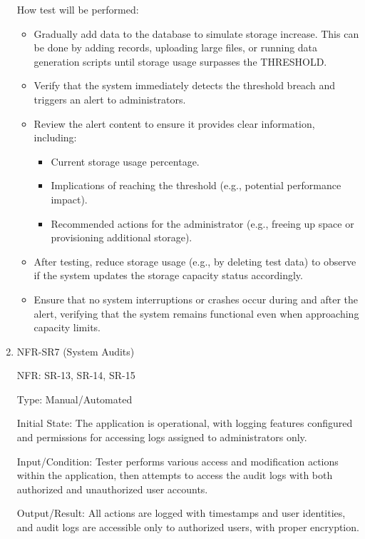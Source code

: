 \documentclass[12pt, titlepage]{article}
\begin{document}
\begin{enumerate}
  How test will be performed: 
  \begin{itemize}
    \item Gradually add data to the database to simulate storage increase. This
    can be done by adding records, uploading large files, or running data
    generation scripts until storage usage surpasses the THRESHOLD.
    \item Verify that the system immediately detects the threshold breach and
    triggers an alert to administrators.
    \item Review the alert content to ensure it provides clear information,
    including:
    \begin{itemize}
      \item Current storage usage percentage.
      \item Implications of reaching the threshold (e.g., potential performance
      impact).
      \item Recommended actions for the administrator (e.g., freeing up space or
      provisioning additional storage).
    \end{itemize}
    \item After testing, reduce storage usage (e.g., by deleting test data) to
    observe if the system updates the storage capacity status accordingly.
    \item Ensure that no system interruptions or crashes occur during and after
    the alert, verifying that the system remains functional even when
    approaching capacity limits.
  \end{itemize}

\item{NFR-SR7 (System Audits)\\}
  
  NFR: SR-13, SR-14, SR-15
  
  Type: Manual/Automated
  
  Initial State: The application is operational, with logging features
  configured and permissions for accessing logs assigned to administrators only.
  
  Input/Condition: Tester performs various access and modification actions
  within the application, then attempts to access the audit logs with both
  authorized and unauthorized user accounts.
  
  Output/Result: All actions are logged with timestamps and user identities, and
  audit logs are accessible only to authorized users, with proper encryption.


\end{enumerate}
\end{document}
